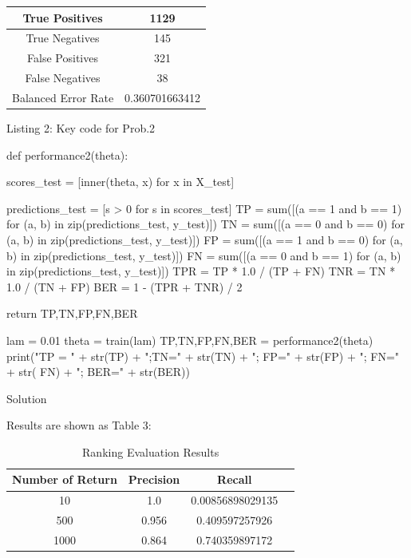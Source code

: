 \documentclass{assignment}
\begin{document}
\begin{problemlist}
\begin{table}[h]
\begin{tabular}{|c|c|}
\hline
True Positives & 1129 \\
\hline
True Negatives & 145  \\
\hline
False Positives & 321  \\
\hline
False Negatives & 38 \\
\hline
Balanced Error Rate & 0.360701663412  \\
\hline
\end{tabular}
\end{table}

\begin{center} 
Listing 2: Key code for Prob.2
\end{center}
\begin{python}
def performance2(theta):

    scores_test = [inner(theta, x) for x in X_test]

    predictions_test = [s > 0 for s in scores_test]
    TP = sum([(a == 1 and b == 1) for (a, b) in zip(predictions_test, y_test)])
    TN = sum([(a == 0 and b == 0) for (a, b) in zip(predictions_test, y_test)])
    FP = sum([(a == 1 and b == 0) for (a, b) in zip(predictions_test, y_test)])
    FN = sum([(a == 0 and b == 1) for (a, b) in zip(predictions_test, y_test)])
    TPR = TP * 1.0 / (TP + FN)
    TNR = TN * 1.0 / (TN + FP)
    BER = 1 - (TPR + TNR) / 2

    return TP,TN,FP,FN,BER


lam = 0.01
theta = train(lam)
TP,TN,FP,FN,BER = performance2(theta)
print("TP = " + str(TP) + ";TN=" + str(TN) + "; FP=" + str(FP) + "; FN=" + str(
FN) + "; BER=" + str(BER))
\end{python}

\pbitem Solution

\begin{table}[h]
Results are shown as Table 3:

\vspace{2ex}
\centering
\caption{Ranking Evaluation Results}
\vspace{1ex}

\begin{tabular}{|c|c|c|c|}
\hline
Number of Return & Precision & Recall \\
\hline
10 & 1.0 & 0.00856898029135  \\
\hline
500 & 0.956 & 0.409597257926  \\
\hline
1000 & 0.864 & 0.740359897172 \\
\hline
\end{tabular}
\end{table}


\end{problemlist}
\end{document}
